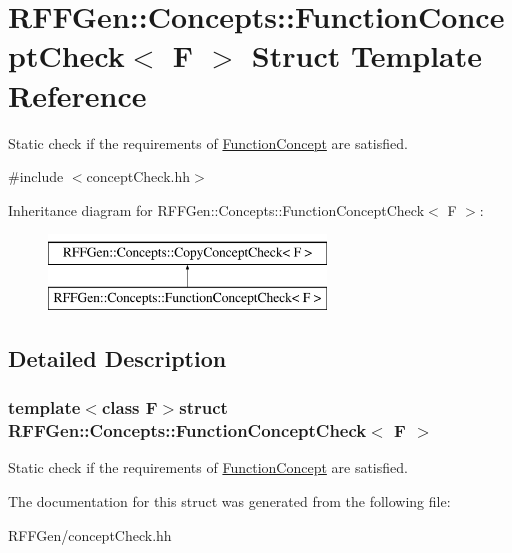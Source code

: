 \hypertarget{structRFFGen_1_1Concepts_1_1FunctionConceptCheck}{\section{R\-F\-F\-Gen\-:\-:Concepts\-:\-:Function\-Concept\-Check$<$ F $>$ Struct Template Reference}
\label{structRFFGen_1_1Concepts_1_1FunctionConceptCheck}
}


Static check if the requirements of \hyperlink{structRFFGen_1_1Concepts_1_1FunctionConcept}{Function\-Concept} are satisfied.  




{\ttfamily \#include $<$concept\-Check.\-hh$>$}

Inheritance diagram for R\-F\-F\-Gen\-:\-:Concepts\-:\-:Function\-Concept\-Check$<$ F $>$\-:\begin{figure}[H]
\begin{center}
\leavevmode
\includegraphics[height=2.000000cm]{structRFFGen_1_1Concepts_1_1FunctionConceptCheck}
\end{center}
\end{figure}


\subsection{Detailed Description}
\subsubsection*{template$<$class F$>$struct R\-F\-F\-Gen\-::\-Concepts\-::\-Function\-Concept\-Check$<$ F $>$}

Static check if the requirements of \hyperlink{structRFFGen_1_1Concepts_1_1FunctionConcept}{Function\-Concept} are satisfied. 

The documentation for this struct was generated from the following file\-:\begin{DoxyCompactItemize}
\item 
R\-F\-F\-Gen/concept\-Check.\-hh\end{DoxyCompactItemize}
